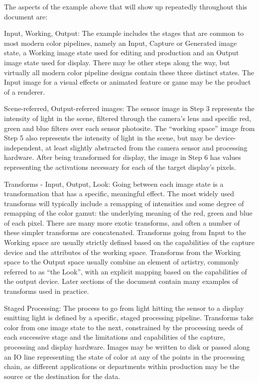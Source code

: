 The aspects of the example above that will show up repeatedly throughout this document are:

Input, Working, Output: The example includes the stages that are common to most modern color pipelines, namely an Input, Capture or Generated image state, a Working image state used for editing and production and an Output image state used for display. There may be other steps along the way, but virtually all modern color pipeline designs contain these three distinct states. The Input image for a visual effects or animated feature or game may be the product of a renderer.

Scene-referred, Output-referred images: The sensor image in Step 3 represents the intensity of light in the scene, filtered through the camera’s lens and specific red, green and blue filters over each sensor photosite. The “working space” image from Step 5 also represents the intensity of light in the scene, but may be device-independent, at least slightly abstracted from the camera sensor and processing hardware. After being transformed for display, the image in Step 6 has values representing the activations necessary for each of the target display’s pixels.

Transforms - Input, Output, Look: Going between each image state is a transformation that has a specific, meaningful effect. The most widely used transforms will typically include a remapping of intensities and some degree of remapping of the color gamut: the underlying meaning of the red, green and blue of each pixel. There are many more exotic transforms, and often a number of these simpler transforms are concatenated. Transforms going from Input to the Working space are usually strictly defined based on the capabilities of the capture device and the attributes of the working space. Transforms from the Working space to the Output space usually combine an element of artistry, commonly referred to as “the Look”, with an explicit mapping based on the capabilities of the output device. Later sections of the document contain many examples of transforms used in practice.

Staged Processing: The process to go from light hitting the sensor to a display emitting light is defined by a specific, staged processing pipeline. Transforms take color from one image state to the next, constrained by the processing needs of each successive stage and the limitations and capabilities of the capture, processing and display hardware. Images may be written to disk or passed along an IO line representing the state of color at any of the points in the processing chain, as different applications or departments within production may be the source or the destination for the data.

